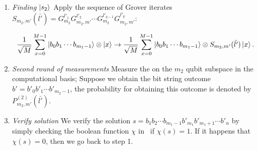 \begin{enumerate}
\item \emph{Finding $\ket{s_2}$}\newline
Apply the sequence of Grover iterates $S_{m_2,m'}(\bar{l'}) = G_{m_2}^{l'_1} G_{m_2,m'}^{l'_2} \cdots G_{m_2}^{l'_{q-1}}G_{m_2, m'}^{l'_q}$:

\begin{align*}
	\frac{1}{\sqrt{M}}\displaystyle\sum_{x=0}^{M-1} \ket{b_0b_1\cdots b_{m_1 -1}}\otimes\ket{x} \to \frac{1}{\sqrt{M}}\displaystyle\sum_{x=0}^{M-1} \ket{b_0b_1\cdots b_{m_1 - 1}}\otimes S_{m_2,m'}(\bar{l'})\ket{x}.
\end{align*}

\item \emph{Second round of measurements}\newline
    Measure the on the $m_2$ qubit subspace in the computational basis; Suppose we obtain the bit string outcome $b' = b'_0b'_1\cdots b'_{m_2-1}$, the probability for obtaining this outcome is denoted by $P_{m_2, m'}^{(2)}(\bar{l'})$.

\item \emph{Verify solution} \newline
	We verify the solution $s = b_1b_2\cdots b_{m_1-1} b'_{m_1}b'_{m_1+1}\cdots b'_{n}$ by simply checking the boolean function $\chi$ in~ if $\chi(s) = 1$. If it happens that $\chi(s) = 0$, then we go back to step 1.

\end{enumerate}


